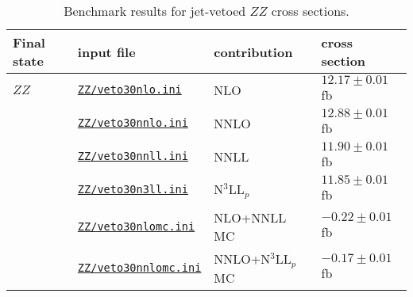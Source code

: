 \renewcommand{\arraystretch}{1.05}
\begin{table}
\begin{tabular}{llll}
\hline
Final state & input file & contribution & cross section \\
\hline
$ZZ$
& \href{\mcfmprocs/Files81/jetveto/veto30nlo.ini}{\texttt{ZZ/veto30nlo.ini}}        & NLO                 & $12.17 \pm 0.01$ fb \\
& \href{\mcfmprocs/Files81/jetveto/veto30nnlo.ini}{\texttt{ZZ/veto30nnlo.ini}}      & NNLO                & $12.88 \pm 0.01$ fb \\
& \href{\mcfmprocs/Files81/jetveto/veto30nnll.ini}{\texttt{ZZ/veto30nnll.ini}}      & NNLL                & $11.90 \pm 0.01$ fb \\
& \href{\mcfmprocs/Files81/jetveto/veto30n3ll.ini}{\texttt{ZZ/veto30n3ll.ini}}      & N$^3$LL$_p$         & $11.85 \pm 0.01$ fb \\
& \href{\mcfmprocs/Files81/jetveto/veto30nlomc.ini}{\texttt{ZZ/veto30nlomc.ini}}    & NLO+NNLL MC         & $-0.22 \pm 0.01$ fb \\
& \href{\mcfmprocs/Files81/jetveto/veto30nnlomc.ini}{\texttt{ZZ/veto30nnlomc.ini}}  & NNLO+N$^3$LL$_p$ MC & $-0.17 \pm 0.01$ fb \\[2pt]
\hline
\end{tabular}
\caption{Benchmark results for jet-vetoed $ZZ$ cross sections.}
\label{table:jetveto_ZZ}
\end{table}
\renewcommand{\arraystretch}{1.0}
